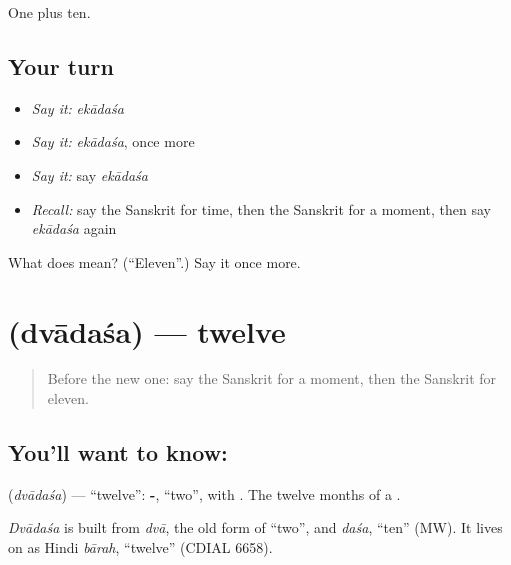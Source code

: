 \begin{grammarlens}[title={What you've built}]
One plus ten.
\end{grammarlens}

\subsection*{Your turn}
\begin{itemize}
\raggedright
  \item \emph{Say it:} \emph{ekādaśa}
  \item \emph{Say it:} \emph{ekādaśa}, once more
  \item \emph{Say it:} say \emph{ekādaśa}
  \item \emph{Recall:} say the Sanskrit for time, then the Sanskrit for a moment, then say \emph{ekādaśa} again
\end{itemize}

\begin{tcolorbox}[breakable,colback=teal!4,colframe=teal!35!black,title={Before you move on}]
What does  mean? (\textquotedblleft{}Eleven\textquotedblright{}.) Say it once more.
\end{tcolorbox}
\section[\texorpdfstring{\sk{द्वादश} (dvādaśa)}{द्वादश (dvādaśa)}]{ (dvādaśa) — twelve}

\label{lesson:SA-C87-twelve}



\begin{quote}
Before the new one: say the Sanskrit for a moment, then the Sanskrit for eleven.
\end{quote}

\subsection*{You'll want to know: }
\textbf{} (\emph{dvādaśa}) — \textquotedblleft{}twelve\textquotedblright{}: \textbf{-}, \textquotedblleft{}two\textquotedblright{}, with \textbf{}. The twelve months of a \textbf{}.

\begin{cousinweb}
\emph{Dvādaśa} is built from \emph{dvā}, the old form of \textquotedblleft{}two\textquotedblright{}, and \emph{daśa}, \textquotedblleft{}ten\textquotedblright{} (MW). It lives on as Hindi \emph{bārah}, \textquotedblleft{}twelve\textquotedblright{} (CDIAL 6658).
\end{cousinweb}

